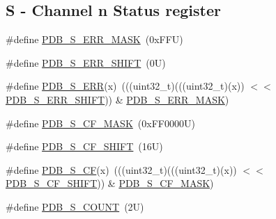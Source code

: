 \subsection*{S -\/ Channel n Status register}
\begin{DoxyCompactItemize}
\item 
\#define \mbox{\hyperlink{group___p_d_b___register___masks_ga544472023dc6de6708b210d54d64c69c}{P\+D\+B\+\_\+\+S\+\_\+\+E\+R\+R\+\_\+\+M\+A\+SK}}~(0x\+F\+F\+U)
\item 
\#define \mbox{\hyperlink{group___p_d_b___register___masks_ga3b10142858bded9ff7916076433dbcb6}{P\+D\+B\+\_\+\+S\+\_\+\+E\+R\+R\+\_\+\+S\+H\+I\+FT}}~(0\+U)
\item 
\#define \mbox{\hyperlink{group___p_d_b___register___masks_gae5f66f6b1c641d52cb706ac11428e11d}{P\+D\+B\+\_\+\+S\+\_\+\+E\+RR}}(x)~(((uint32\+\_\+t)(((uint32\+\_\+t)(x)) $<$$<$ \mbox{\hyperlink{group___p_d_b___register___masks_ga3b10142858bded9ff7916076433dbcb6}{P\+D\+B\+\_\+\+S\+\_\+\+E\+R\+R\+\_\+\+S\+H\+I\+FT}})) \& \mbox{\hyperlink{group___p_d_b___register___masks_ga544472023dc6de6708b210d54d64c69c}{P\+D\+B\+\_\+\+S\+\_\+\+E\+R\+R\+\_\+\+M\+A\+SK}})
\item 
\#define \mbox{\hyperlink{group___p_d_b___register___masks_gabf6ae593f200a1eda316cd9affa9f5b2}{P\+D\+B\+\_\+\+S\+\_\+\+C\+F\+\_\+\+M\+A\+SK}}~(0x\+F\+F0000\+U)
\item 
\#define \mbox{\hyperlink{group___p_d_b___register___masks_ga17f0097777c1377488f0bf9654021714}{P\+D\+B\+\_\+\+S\+\_\+\+C\+F\+\_\+\+S\+H\+I\+FT}}~(16\+U)
\item 
\#define \mbox{\hyperlink{group___p_d_b___register___masks_gaa9865ff9f9ab4bd805a99b75ee73c7e5}{P\+D\+B\+\_\+\+S\+\_\+\+CF}}(x)~(((uint32\+\_\+t)(((uint32\+\_\+t)(x)) $<$$<$ \mbox{\hyperlink{group___p_d_b___register___masks_ga17f0097777c1377488f0bf9654021714}{P\+D\+B\+\_\+\+S\+\_\+\+C\+F\+\_\+\+S\+H\+I\+FT}})) \& \mbox{\hyperlink{group___p_d_b___register___masks_gabf6ae593f200a1eda316cd9affa9f5b2}{P\+D\+B\+\_\+\+S\+\_\+\+C\+F\+\_\+\+M\+A\+SK}})
\item 
\#define \mbox{\hyperlink{group___p_d_b___register___masks_ga3c67630b6a4a3e8b25319d2979004627}{P\+D\+B\+\_\+\+S\+\_\+\+C\+O\+U\+NT}}~(2\+U)
\end{DoxyCompactItemize}
